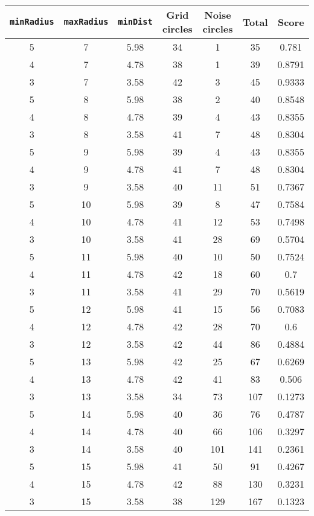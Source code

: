 \documentclass[letterpaper, 12pt]{article}
\begin{document}
\begin{longtable}{|c|c|c|c|c|c|c|}
\hline
\textbf{\texttt{minRadius}} & \textbf{\texttt{maxRadius}} & \textbf{\texttt{minDist}} & \textbf{Grid circles} & \textbf{Noise circles} & \textbf{Total} & \textbf{Score} \\
\hline
5 & 7 & 5.98 & 34 & 1 & 35 & 0.781 \\
\hline
4 & 7 & 4.78 & 38 & 1 & 39 & 0.8791 \\
\hline
3 & 7 & 3.58 & 42 & 3 & 45 & 0.9333 \\
\hline
5 & 8 & 5.98 & 38 & 2 & 40 & 0.8548 \\
\hline
4 & 8 & 4.78 & 39 & 4 & 43 & 0.8355 \\
\hline
3 & 8 & 3.58 & 41 & 7 & 48 & 0.8304 \\
\hline
5 & 9 & 5.98 & 39 & 4 & 43 & 0.8355 \\
\hline
4 & 9 & 4.78 & 41 & 7 & 48 & 0.8304 \\
\hline
3 & 9 & 3.58 & 40 & 11 & 51 & 0.7367 \\
\hline
5 & 10 & 5.98 & 39 & 8 & 47 & 0.7584 \\
\hline
4 & 10 & 4.78 & 41 & 12 & 53 & 0.7498 \\
\hline
3 & 10 & 3.58 & 41 & 28 & 69 & 0.5704 \\
\hline
5 & 11 & 5.98 & 40 & 10 & 50 & 0.7524 \\
\hline
4 & 11 & 4.78 & 42 & 18 & 60 & 0.7 \\
\hline
3 & 11 & 3.58 & 41 & 29 & 70 & 0.5619 \\
\hline
5 & 12 & 5.98 & 41 & 15 & 56 & 0.7083 \\
\hline
4 & 12 & 4.78 & 42 & 28 & 70 & 0.6 \\
\hline
3 & 12 & 3.58 & 42 & 44 & 86 & 0.4884 \\
\hline
5 & 13 & 5.98 & 42 & 25 & 67 & 0.6269 \\
\hline
4 & 13 & 4.78 & 42 & 41 & 83 & 0.506 \\
\hline
3 & 13 & 3.58 & 34 & 73 & 107 & 0.1273 \\
\hline
5 & 14 & 5.98 & 40 & 36 & 76 & 0.4787 \\
\hline
4 & 14 & 4.78 & 40 & 66 & 106 & 0.3297 \\
\hline
3 & 14 & 3.58 & 40 & 101 & 141 & 0.2361 \\
\hline
5 & 15 & 5.98 & 41 & 50 & 91 & 0.4267 \\
\hline
4 & 15 & 4.78 & 42 & 88 & 130 & 0.3231 \\
\hline
3 & 15 & 3.58 & 38 & 129 & 167 & 0.1323 \\

\end{longtable}
\end{document}
